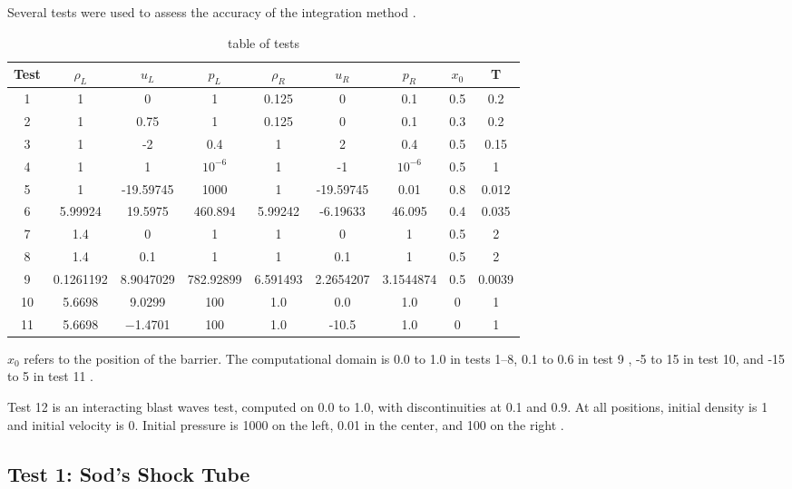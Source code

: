 \documentclass[10pt]{article}
\begin{document}
Several tests were used to assess the accuracy of the integration method \citep{LiskaWendroff2003}. 
\begin{table}[h!]
\begin{center}
\begin{tabular}{ |c|c c c|c c c|c c| }
 \hline
 Test & $\rho_L$ & $u_L$ & $p_L$ & $\rho_R$ & $u_R$ & $p_R$ & $x_0$ & T \\
 \hline
 1 & 1 & 0 & 1 & 0.125 & 0 & 0.1 & 0.5 & 0.2 \\
 2 & 1 & 0.75 & 1 & 0.125 & 0 & 0.1 & 0.3 & 0.2 \\
 3 & 1 & -2 & 0.4 & 1 & 2 & 0.4 & 0.5 & 0.15 \\
 4 & 1 & 1 & $10^{-6}$ & 1 & -1 & $10^{-6}$ & 0.5 & 1 \\
 5 & 1 & -19.59745 & 1000 & 1 & -19.59745 & 0.01 & 0.8 & 0.012 \\
 6 & 5.99924 & 19.5975 & 460.894 & 5.99242 & -6.19633 & 46.095 & 0.4 & 0.035 \\
 7 & 1.4 & 0 & 1 & 1 & 0 & 1 & 0.5 & 2 \\
 8 & 1.4 & 0.1 & 1 & 1 & 0.1 & 1 & 0.5 & 2 \\
 9 & 0.1261192 & 8.9047029 & 782.92899 & 6.591493 & 2.2654207 & 3.1544874 & 0.5 & 0.0039 \\
10 & 5.6698 & 9.0299 & 100 & 1.0 & 0.0 & 1.0 & 0 & 1 \\
11 & 5.6698 & −1.4701 & 100 & 1.0 & -10.5 & 1.0 & 0 & 1 \\
 \hline
\end{tabular}
  \caption{table of tests}
  \label{tab:testtable}
\end{center}
\end{table}
$x_0$ refers to the position of the barrier. The computational domain is 0.0 to 1.0 in tests 1--8, 0.1 to 0.6 in test 9 \citep{LiskaWendroff2003}, -5 to 15 in test 10, and -15 to 5 in test 11 \citep{Leveque2002}. 

Test 12 is an interacting blast waves test, computed on 0.0 to 1.0, with discontinuities at 0.1 and 0.9. At all positions, initial density is 1 and initial velocity is 0. Initial pressure is 1000 on the left, 0.01 in the center, and 100 on the right \citep{LiskaWendroff2003}.
\subsection{Test 1: Sod's Shock Tube} 
\end{document}
